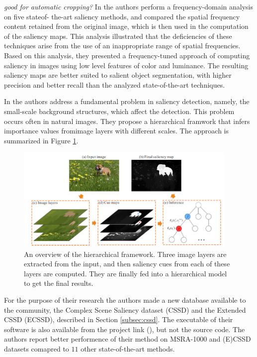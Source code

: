 {\em good for automatic cropping?}
In \cite{LCAV-CONF-2009-012} the authors perform a frequency-domain analysis on five stateof-
the-art saliency methods, and compared the spatial frequency
content retained from the original image, which is
then used in the computation of the saliency maps. This
analysis illustrated that the deficiencies of these techniques
arise from the use of an inappropriate range of spatial frequencies.
Based on this analysis, they presented a frequency-tuned
approach of computing saliency in images using low
level features of color and luminance. The resulting saliency maps are better suited to salient object segmentation, with higher precision and
better recall than the analyzed state-of-the-art techniques.

In \cite{YanCVPR2013} the authors address a fundamental problem in saliency detection, namely, the small-scale background structures, which affect the detection. This problem occurs often in natural images. They propose a hierarchical framwork that infers importance values fromimage layers with different scales. The approach is summarized in Figure \ref{fig:hier_yan13}.

\begin{figure}[H]
\begin{center}
\includegraphics[width=0.95\textwidth]{fig/Hierarchy_Yan13}
\end{center}
\caption{An overview of the hierarchical framework. Three image layers are extracted from the input, and then  saliency cues from each of these layers are computed. They are finally fed into a hierarchical model to get the final results.}
\label{fig:hier_yan13}
\end{figure}

For the purpose of their research the authors made a new database available to the community, the Complex Scene Saliency dataset (CSSD) and the Extended CSSD (ECSSD), described in Section \ref{subsec:cssd}. The executable of their software is also available from the project link (\cite{ecssd_db}), but not the source code. The authors report better performence of their method on MSRA-1000 and (E)CSSD datasets comapred to $11$ other state-of-the-art methods.

